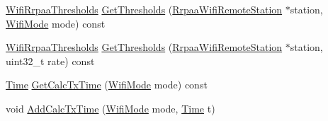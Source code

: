 \begin{DoxyCompactItemize}
\item 
\hyperlink{structns3_1_1WifiRrpaaThresholds}{Wifi\+Rrpaa\+Thresholds} \hyperlink{classns3_1_1RrpaaWifiManager_a24c9e8ec2c007b3f48cb7b38d4b6a39d}{Get\+Thresholds} (\hyperlink{structns3_1_1RrpaaWifiRemoteStation}{Rrpaa\+Wifi\+Remote\+Station} $\ast$station, \hyperlink{classns3_1_1WifiMode}{Wifi\+Mode} mode) const 
\item 
\hyperlink{structns3_1_1WifiRrpaaThresholds}{Wifi\+Rrpaa\+Thresholds} \hyperlink{classns3_1_1RrpaaWifiManager_a276774dec96d9cbc769924383033ec5c}{Get\+Thresholds} (\hyperlink{structns3_1_1RrpaaWifiRemoteStation}{Rrpaa\+Wifi\+Remote\+Station} $\ast$station, uint32\+\_\+t rate) const 
\item 
\hyperlink{classns3_1_1Time}{Time} \hyperlink{classns3_1_1RrpaaWifiManager_aa451260951bf94eb96448ca5b4e131e0}{Get\+Calc\+Tx\+Time} (\hyperlink{classns3_1_1WifiMode}{Wifi\+Mode} mode) const 
\item 
void \hyperlink{classns3_1_1RrpaaWifiManager_ae980e62c08d576d13c66f0acc81cc8f0}{Add\+Calc\+Tx\+Time} (\hyperlink{classns3_1_1WifiMode}{Wifi\+Mode} mode, \hyperlink{classns3_1_1Time}{Time} t)
\end{DoxyCompactItemize}
